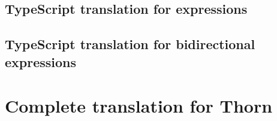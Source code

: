 \documentclass[a4paper,USenglish]{tex/lipics-v2016}
\begin{document}
\subsection{TypeScript translation for expressions}

\begin{mathpar}




\end{mathpar}

\subsection{TypeScript translation for bidirectional expressions}

\begin{mathpar}


\end{mathpar}

\section{Complete translation for Thorn}
\end{document}
